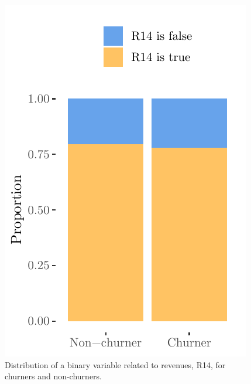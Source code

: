 \begin{figure}
    \centering
    \begin{minipage}{.45\textwidth}
    	\includegraphics{figures/binary.pdf}
    	\caption{Distribution of a binary variable related to revenues, R14, for
    	churners and non-churners.}
    	\label{fig:binary}
    \end{minipage}
    \hspace{0.05\textwidth}
    \begin{minipage}{.45\textwidth}

\end{minipage}
\end{figure}
